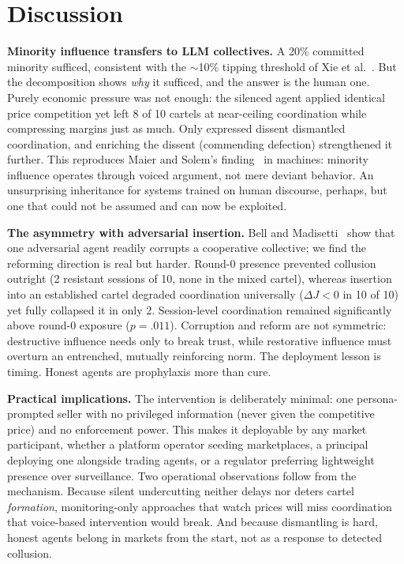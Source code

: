 \documentclass[acmsmall]{acmart}
\begin{document}
\section{Discussion}
\textbf{Minority influence transfers to LLM collectives.}
A 20\% committed minority sufficed, consistent with the $\sim$10\% tipping
threshold of Xie et al.~\cite{xie2011social}. But the decomposition shows
\emph{why} it sufficed, and the answer is the human one. Purely economic
pressure was not enough: the silenced agent applied identical price
competition yet left 8 of 10 cartels at near-ceiling coordination while
compressing margins just as much. Only expressed dissent dismantled
coordination, and enriching the dissent (commending defection) strengthened
it further. This reproduces Maier and Solem's finding~\cite{maier1952contribution}
in machines: minority influence operates through voiced argument, not mere
deviant behavior. An unsurprising inheritance for systems trained on human
discourse, perhaps, but one that could not be assumed and can now be exploited.

\textbf{The asymmetry with adversarial insertion.}
Bell and Madisetti~\cite{bell2026corruption} show that one adversarial agent
readily corrupts a cooperative collective; we find the reforming direction is
real but harder. Round-0 presence prevented collusion outright (2 resistant
sessions of 10, none in the mixed cartel), whereas insertion into an established
cartel degraded coordination universally ($\Delta J<0$ in 10 of 10) yet fully
collapsed it in only 2. Session-level coordination remained significantly
above round-0 exposure ($p{=}.011$). Corruption and reform are not symmetric:
destructive influence needs only to break trust, while restorative influence
must overturn an entrenched, mutually reinforcing norm. The deployment lesson
is timing. Honest agents are prophylaxis more than cure.

\textbf{Practical implications.}
The intervention is deliberately minimal: one persona-prompted seller with no
privileged information (never given the competitive price) and no enforcement
power. This makes it deployable by any market participant, whether a platform
operator seeding marketplaces, a principal deploying one alongside trading
agents, or a regulator preferring lightweight presence over surveillance. Two
operational observations follow from the mechanism. Because silent undercutting
neither delays nor deters cartel \emph{formation}, monitoring-only approaches
that watch prices will miss coordination that voice-based intervention would
break. And because dismantling is hard, honest agents belong in markets from
the start, not as a response to detected collusion.
\end{document}

